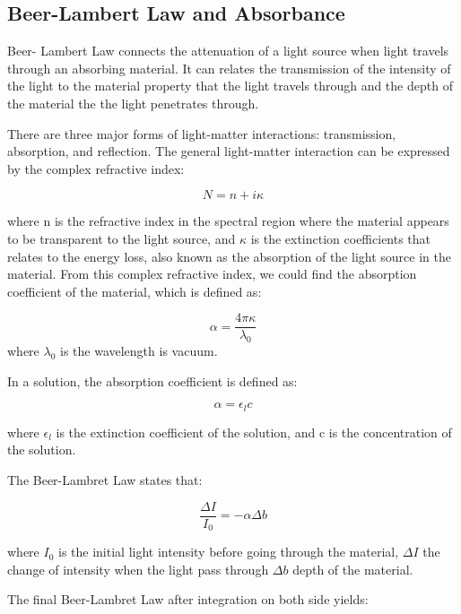 \documentclass{article}
\begin{document}
\subsection{Beer-Lambert Law and Absorbance}

Beer- Lambert Law connects the attenuation of a light source when light travels through an absorbing material. It can relates the transmission of the intensity of the light to the material property that the light travels through and the depth of the material the the light penetrates through.

There are three major forms of light-matter interactions: transmission, absorption, and reflection. The general light-matter interaction can be expressed by the complex refractive index:

\begin{equation}
    N = n + i\kappa
\end{equation}

where n is the refractive index in the spectral region where the material appears to be transparent to the light source, and $\kappa$ is the extinction coefficients that relates to the energy loss, also known as the absorption of the light source in the material. From this complex refractive index, we could find the absorption coefficient of the material, which is defined as:

\begin{equation}
    \alpha = \frac{4\pi \kappa}{\lambda_0}
\end{equation}
where $\lambda_0$ is the wavelength is vacuum.

In a solution, the absorption coefficient is defined as:

\begin{equation}
    \alpha = \epsilon_l c
\end{equation}

where $\epsilon_l$ is the extinction coefficient of the solution, and c is the concentration of the solution.

The Beer-Lambret Law states that: 

\begin{equation}
    \frac{\Delta I }{I_0} = - \alpha \Delta b
\end{equation}

where $I_0$ is the initial light intensity before going through the material, $\Delta I $ the change of intensity when the light pass through $\Delta b$ depth of the material. 

The final Beer-Lambret Law after integration on both side yields:
\end{document}
